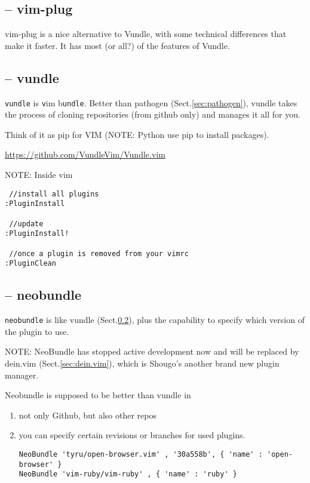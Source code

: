 \subsection{-- vim-plug}
\label{sec:vim-plug}

vim-plug is a nice alternative to Vundle, with some technical differences that
make it faster. It has most (or all?) of the features of Vundle.

\subsection{-- vundle}
\label{sec:vundle}

\verb!vundle! is \verb!v!im b\verb!undle!.
Better than pathogen (Sect.\ref{sec:pathogen}), vundle takes the process of
cloning repositories (from github only) and manages it all for you.

Think of it as pip for VIM (NOTE: Python use pip to install packages).

\url{https://github.com/VundleVim/Vundle.vim}

NOTE: Inside vim
\begin{verbatim}
 //install all plugins
:PluginInstall
 
 //update
:PluginInstall!

 //once a plugin is removed from your vimrc
:PluginClean
\end{verbatim}


\subsection{-- neobundle}
\label{sec:neobundle}

\verb!neobundle! is like vundle (Sect.\ref{sec:vundle}), plus the capability to
specify which version of the plugin to use.

NOTE: NeoBundle has stopped active development now and will be replaced by
dein.vim (Sect.\ref{sec:dein.vim}), which is Shougo's another brand new plugin
manager.


Neobundle is supposed to be better than vundle in
\begin{enumerate}
  \item not only Github, but also other repos
  
  \item  you can specify certain revisions or branches for used plugins.
\begin{verbatim}
NeoBundle 'tyru/open-browser.vim' , '30a558b', { 'name' : 'open-browser' }
NeoBundle 'vim-ruby/vim-ruby' , { 'name' : 'ruby' }
\end{verbatim}
\end{enumerate}

